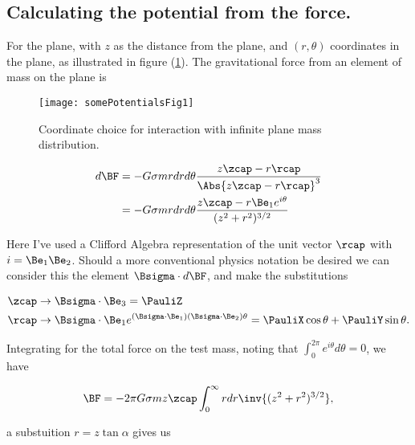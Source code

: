 \subsection{Calculating the potential from the force.}

For the plane, with $z$ as the distance from the plane, and $(r,\theta)$ coordinates in the plane, as illustrated in figure (\ref{fig:classicalMechanicsPs2:somePotentialsFig1}).  The gravitational force from an element of mass on the plane is
\begin{figure}[htp]
   \centering
   \texttt{[image: somePotentialsFig1]}
   \caption{Coordinate choice for interaction with infinite plane mass distribution.}\label{fig:classicalMechanicsPs2:somePotentialsFig1}
\end{figure}

\begin{align*}
d\BF
&= -G \sigma m r dr d\theta \frac{z \zcap - r \rcap}{\Abs{z \zcap - r \rcap}^3 } \\
&= -G \sigma m r dr d\theta \frac{z \zcap - r \Be_1 e^{i \theta} }{(z^2 + r^2)^{3/2} } \\
\end{align*}

Here I've used a Clifford Algebra representation of the unit vector $\rcap$ with $i = \Be_1 \Be_2$.  Should a more conventional physics notation be desired we can consider this the element $\Bsigma \cdot d\BF$, and make the substitutions

\begin{align*}
\zcap &\rightarrow \Bsigma \cdot \Be_3 = \PauliZ
\\
\rcap &\rightarrow \Bsigma \cdot \Be_1 e^{ (\Bsigma \cdot \Be_1) (\Bsigma \cdot \Be_2) \theta} = \PauliX \cos\theta + \PauliY \sin\theta.
\end{align*}

Integrating for the total force on the test mass, noting that $\int_0^{2 \pi} e^{i\theta} d\theta = 0$, we have

\begin{equation}\label{eqn:classicalMechanicsPs2:10}
\BF = - 2 \pi G \sigma m z \zcap \int_0^\infty r dr \inv{(z^2 + r^2)^{3/2} },
\end{equation}

a substuition $r = z \tan \alpha$ gives us

